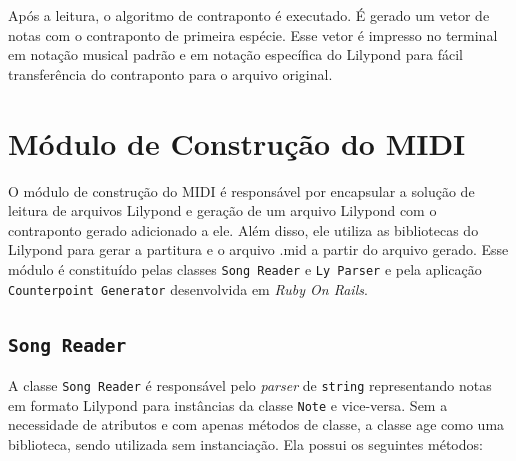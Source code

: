     Após a leitura, o algoritmo de contraponto é executado. É gerado um vetor de notas com o contraponto de primeira espécie. Esse vetor é impresso no terminal em notação musical padrão e em notação específica do Lilypond para fácil transferência do contraponto para o arquivo original.

  \section[Módulo de Construção do MIDI]{Módulo de Construção do MIDI}

    O módulo de construção do MIDI é responsável por encapsular a solução de leitura de arquivos Lilypond e geração de um arquivo Lilypond com o contraponto gerado adicionado a ele. Além disso, ele utiliza as bibliotecas do Lilypond para gerar a partitura e o arquivo .mid a partir do arquivo gerado. Esse módulo é constituído pelas classes \texttt{Song Reader} e \texttt{Ly Parser} e pela aplicação \texttt{Counterpoint Generator} desenvolvida em \textit{Ruby On Rails}.

    \subsection[\texttt{Song Reader}]{\texttt{Song Reader}}

      A classe \texttt{Song Reader} é responsável pelo \textit{parser} de \texttt{string} representando notas em formato Lilypond para instâncias da classe \texttt{Note} e vice-versa. Sem a necessidade de atributos e com apenas métodos de classe, a classe age como uma biblioteca, sendo utilizada sem instanciação. Ela possui os seguintes métodos:



